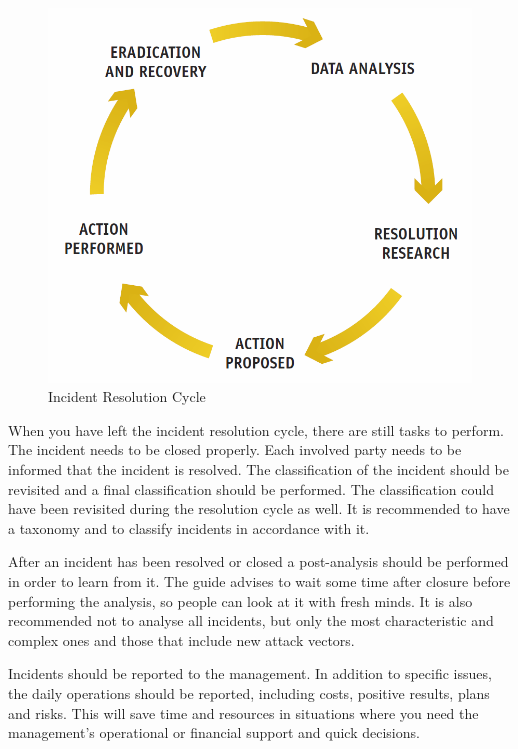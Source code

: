 \begin{figure}[h]
\begin{center}
\includegraphics[scale=0.4]{IncidentResolutionCycle.png}
\caption[ENISA Incident Resolution Cycle]{Incident Resolution Cycle \cite{enisaGuide}}
\label{fig:IncidentResolutionCycle}
\end{center}
\end{figure}

When you have left the incident resolution cycle, there are still tasks to perform. The incident needs to be closed properly. Each involved party needs to be informed that the incident is resolved. The classification of the incident should be revisited and a final classification should be performed. The classification could have been revisited during the resolution cycle as well. It is recommended to have a taxonomy and to classify incidents in accordance with it.

After an incident has been resolved or closed a post-analysis should be performed in order to learn from it. The guide advises to wait some time after closure before performing the analysis, so people can look at it with fresh minds. It is also recommended not to analyse all incidents, but only the most characteristic and complex ones and those that include new attack vectors. 

Incidents should be reported to the management. In addition to specific issues, the daily operations should be reported, including costs, positive results, plans and risks. This will save time and resources in situations where you need the management's operational or financial support and quick decisions.



